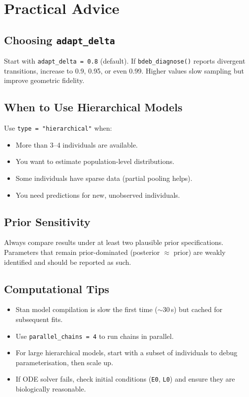\documentclass[11pt,a4paper]{article}
\newcommand{\fn}[1]{\texttt{#1()}}
\newcommand{\code}[1]{\texttt{#1}}
\begin{document}
\section{Practical Advice}
\label{sec:advice}

\subsection{Choosing \texttt{adapt\_delta}}

Start with \code{adapt\_delta = 0.8} (default).  If \fn{bdeb\_diagnose}
reports divergent transitions, increase to 0.9, 0.95, or even 0.99.
Higher values slow sampling but improve geometric fidelity.

\subsection{When to Use Hierarchical Models}

Use \code{type = "hierarchical"} when:
\begin{itemize}[nosep]
  \item More than 3--4 individuals are available.
  \item You want to estimate population-level distributions.
  \item Some individuals have sparse data (partial pooling helps).
  \item You need predictions for new, unobserved individuals.
\end{itemize}

\subsection{Prior Sensitivity}

Always compare results under at least two plausible prior specifications.
Parameters that remain prior-dominated (posterior $\approx$ prior) are
weakly identified and should be reported as such.

\subsection{Computational Tips}

\begin{itemize}[nosep]
  \item Stan model compilation is slow the first time ($\sim$30\,s) but
    cached for subsequent fits.
  \item Use \code{parallel\_chains = 4} to run chains in parallel.
  \item For large hierarchical models, start with a subset of individuals
    to debug parameterisation, then scale up.
  \item If ODE solver fails, check initial conditions (\code{E0}, \code{L0})
    and ensure they are biologically reasonable.
\end{itemize}
\end{document}
